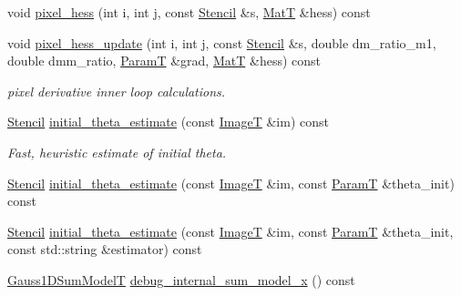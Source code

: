 \begin{DoxyCompactItemize}
\item 
void \hyperlink{classmappel_1_1Gauss2DModel_a8d9e4d4cb049e5ebf2649fd073060191}{pixel\+\_\+hess} (int i, int j, const \hyperlink{classmappel_1_1Gauss2DModel_1_1Stencil}{Stencil} \&s, \hyperlink{namespacemappel_a7091ab87c528041f7e2027195fad8915}{MatT} \&hess) const 
\item 
void \hyperlink{classmappel_1_1Gauss2DModel_aa4ada829604d1a79ef92d0df4fdff94c}{pixel\+\_\+hess\+\_\+update} (int i, int j, const \hyperlink{classmappel_1_1Gauss2DModel_1_1Stencil}{Stencil} \&s, double dm\+\_\+ratio\+\_\+m1, double dmm\+\_\+ratio, \hyperlink{classmappel_1_1PointEmitterModel_a665ec6aea3aac139bb69a23c06d4b9a1}{ParamT} \&grad, \hyperlink{namespacemappel_a7091ab87c528041f7e2027195fad8915}{MatT} \&hess) const 
\begin{DoxyCompactList}\small\item\em pixel derivative inner loop calculations. \end{DoxyCompactList}\item 
\hyperlink{classmappel_1_1Gauss2DModel_1_1Stencil}{Stencil} \hyperlink{classmappel_1_1Gauss2DModel_a5299707f3d6783203e62ba63a8c505ea}{initial\+\_\+theta\+\_\+estimate} (const \hyperlink{classmappel_1_1ImageFormat2DBase_a667ea5016648958e507e7db8eaa041b0}{ImageT} \&im) const 
\begin{DoxyCompactList}\small\item\em Fast, heuristic estimate of initial theta. \end{DoxyCompactList}\item 
\hyperlink{classmappel_1_1Gauss2DModel_1_1Stencil}{Stencil} \hyperlink{classmappel_1_1Gauss2DModel_ae106f548da186199c14cf7133147e779}{initial\+\_\+theta\+\_\+estimate} (const \hyperlink{classmappel_1_1ImageFormat2DBase_a667ea5016648958e507e7db8eaa041b0}{ImageT} \&im, const \hyperlink{classmappel_1_1PointEmitterModel_a665ec6aea3aac139bb69a23c06d4b9a1}{ParamT} \&theta\+\_\+init) const 
\item 
\hyperlink{classmappel_1_1Gauss2DModel_1_1Stencil}{Stencil} \hyperlink{classmappel_1_1Gauss2DModel_a06ace073618689690fd459a30702a7ae}{initial\+\_\+theta\+\_\+estimate} (const \hyperlink{classmappel_1_1ImageFormat2DBase_a667ea5016648958e507e7db8eaa041b0}{ImageT} \&im, const \hyperlink{classmappel_1_1PointEmitterModel_a665ec6aea3aac139bb69a23c06d4b9a1}{ParamT} \&theta\+\_\+init, const std\+::string \&estimator) const 
\item 
\hyperlink{classmappel_1_1Gauss2DModel_a6e41ec1749814a91648caf394edd4385}{Gauss1\+D\+Sum\+ModelT} \hyperlink{classmappel_1_1Gauss2DModel_a74584ea8a12deee6fe3ec3343228f920}{debug\+\_\+internal\+\_\+sum\+\_\+model\+\_\+x} () const 

\end{DoxyCompactItemize}
